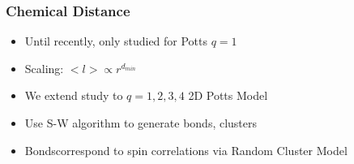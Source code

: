 \documentclass[11pt]{article}
\begin{document}
\subsubsection{Chemical Distance}
\label{sec-5-1-2}
\begin{itemize}

\item Until recently, only studied for Potts $q=1$\\
\label{sec-5-1-2-1}%
\item Scaling: $< l > \propto r^{d_{min}}$\\
\label{sec-5-1-2-2}%
\item We extend study to $q=1,2,3,4$ 2D Potts Model\\
\label{sec-5-1-2-3}%
\item Use S-W algorithm to generate bonds, clusters\\
\label{sec-5-1-2-4}%
\item Bondscorrespond to spin correlations via Random Cluster Model\\
\label{sec-5-1-2-5}%
\end{itemize} %
\end{document}
